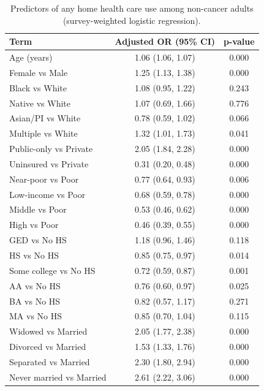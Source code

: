 
\begin{longtable}[t]{lcc}
\caption{\label{tab:tab:use-noncancer}Predictors of any home health care use among non-cancer adults (survey-weighted logistic regression).}\\
\toprule
Term & Adjusted OR (95\% CI) & p-value\\
\midrule
Age (years) & 1.06 (1.06, 1.07) & 0.000\\
Female vs Male & 1.25 (1.13, 1.38) & 0.000\\
Black vs White & 1.08 (0.95, 1.22) & 0.243\\
Native vs White & 1.07 (0.69, 1.66) & 0.776\\
Asian/PI vs White & 0.78 (0.59, 1.02) & 0.066\\
\addlinespace
Multiple vs White & 1.32 (1.01, 1.73) & 0.041\\
Public-only vs Private & 2.05 (1.84, 2.28) & 0.000\\
Uninsured vs Private & 0.31 (0.20, 0.48) & 0.000\\
Near-poor vs Poor & 0.77 (0.64, 0.93) & 0.006\\
Low-income vs Poor & 0.68 (0.59, 0.78) & 0.000\\
\addlinespace
Middle vs Poor & 0.53 (0.46, 0.62) & 0.000\\
High vs Poor & 0.46 (0.39, 0.55) & 0.000\\
GED vs No HS & 1.18 (0.96, 1.46) & 0.118\\
HS vs No HS & 0.85 (0.75, 0.97) & 0.014\\
Some college vs No HS & 0.72 (0.59, 0.87) & 0.001\\
\addlinespace
AA vs No HS & 0.76 (0.60, 0.97) & 0.025\\
BA vs No HS & 0.82 (0.57, 1.17) & 0.271\\
MA vs No HS & 0.85 (0.70, 1.04) & 0.115\\
Widowed vs Married & 2.05 (1.77, 2.38) & 0.000\\
Divorced vs Married & 1.53 (1.33, 1.76) & 0.000\\
\addlinespace
Separated vs Married & 2.30 (1.80, 2.94) & 0.000\\
Never married vs Married & 2.61 (2.22, 3.06) & 0.000\\
\bottomrule
\end{longtable}
